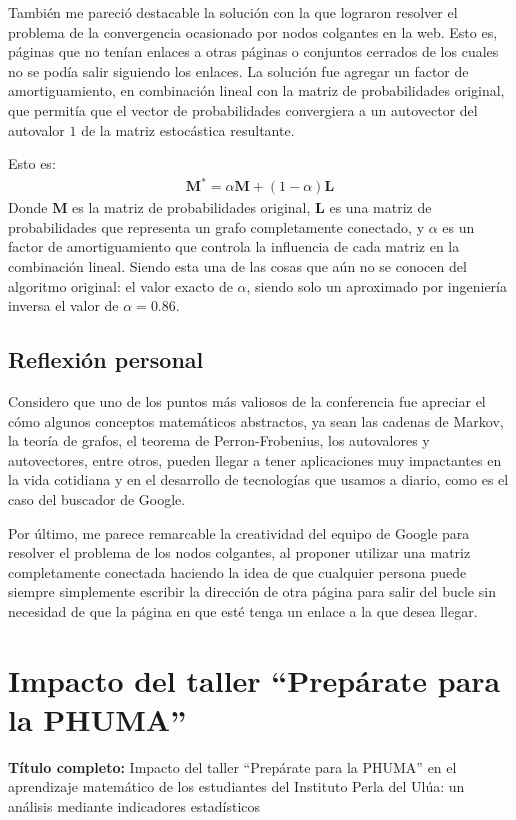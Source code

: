 \documentclass[11pt]{article}
\begin{document}
    También me pareció destacable la solución con la que lograron resolver el problema de la convergencia ocasionado por nodos colgantes en la web. Esto es, páginas que no tenían enlaces a otras páginas o conjuntos cerrados de los cuales no se podía salir siguiendo los enlaces. La solución fue agregar un factor de amortiguamiento, en combinación lineal con la matriz de probabilidades original, que permitía que el vector de probabilidades convergiera a un autovector del autovalor $1$ de la matriz estocástica resultante.

    Esto es:
    \begin{align*}
        \mathbf{M^*} = \alpha \mathbf{M} + (1-\alpha) \mathbf{L}
    \end{align*}
    Donde $\mathbf{M}$ es la matriz de probabilidades original, $\mathbf{L}$ es una matriz de probabilidades que representa un grafo completamente conectado, y $\alpha$ es un factor de amortiguamiento que controla la influencia de cada matriz en la combinación lineal. Siendo esta una de las cosas que aún no se conocen del algoritmo original: el valor exacto de $\alpha$, siendo solo un aproximado por ingeniería inversa el valor de $\alpha = 0.86$.

    \subsection{Reflexión personal}
    Considero que uno de los puntos más valiosos de la conferencia fue apreciar el cómo algunos conceptos matemáticos abstractos, ya sean las cadenas de Markov, la teoría de grafos, el teorema de Perron-Frobenius, los autovalores y autovectores, entre otros, pueden llegar a tener aplicaciones muy impactantes en la vida cotidiana y en el desarrollo de tecnologías que usamos a diario, como es el caso del buscador de Google.

    Por último, me parece remarcable la creatividad del equipo de Google para resolver el problema de los nodos colgantes, al proponer utilizar una matriz completamente conectada haciendo la idea de que cualquier persona puede siempre simplemente escribir la dirección de otra página para salir del bucle sin necesidad de que la página en que esté tenga un enlace a la que desea llegar.

    \section{Impacto del taller ``Prepárate para la PHUMA''}
    \textbf{Título completo:} Impacto del taller ``Prepárate para la PHUMA'' en el aprendizaje matemático de los estudiantes del Instituto Perla del Ulúa: un análisis mediante indicadores estadísticos
\end{document}
